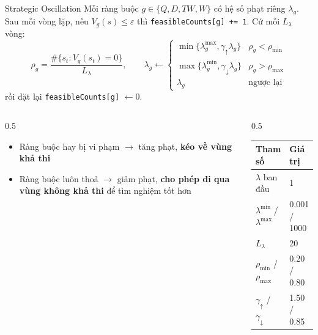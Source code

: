 \documentclass[aspectratio=169]{beamer}
\newcommand{\hl}[1]{\textcolor{blue!60!black}{\textbf{#1}}}
\begin{document}
\begin{frame}{Strategic Oscillation}
  \small Mỗi ràng buộc $g \in \{Q, D, TW, W\}$ có hệ số phạt riêng $\lambda_g$. Sau mỗi vòng lặp, nếu $V_g(s) \le \varepsilon$ thì \texttt{feasibleCounts[g] += 1}. Cứ mỗi $L_\lambda$ vòng:
  $$\rho_g = \frac{\#\{s_t : V_g(s_t) = 0\}}{L_\lambda}, \qquad
  \lambda_g \leftarrow
  \begin{cases}
    \min\{\lambda_g^{\max}, \gamma_\uparrow \lambda_g\} & \rho_g < \rho_{\min} \\
    \max\{\lambda_g^{\min}, \gamma_\downarrow \lambda_g\} & \rho_g > \rho_{\max} \\
    \lambda_g & \text{ngược lại}
  \end{cases}$$
  rồi đặt lại \texttt{feasibleCounts[g]} $\leftarrow 0$.

  \begin{columns}[T]
    \begin{column}{0.5\textwidth}
      \begin{itemize}
        \item \small Ràng buộc hay bị vi phạm $\to$ tăng phạt, \hl{kéo về vùng khả thi}
        \item \small Ràng buộc luôn thoả $\to$ giảm phạt, \hl{cho phép đi qua vùng không khả thi} để tìm nghiệm tốt hơn
      \end{itemize}
    \end{column}
    \begin{column}{0.5\textwidth}
      \centering\small
      \begin{tabular}{ll}
        \toprule
        Tham số & Giá trị \\
        \midrule
        $\lambda$ ban đầu & 1 \\
        $\lambda^{\min}$ / $\lambda^{\max}$ & 0.001 / 1000 \\
        $L_\lambda$ & 20 \\
        $\rho_{\min}$ / $\rho_{\max}$ & 0.20 / 0.80 \\
        $\gamma_\uparrow$ / $\gamma_\downarrow$ & 1.50 / 0.85 \\
        \bottomrule
      \end{tabular}
    \end{column}
  \end{columns}
\end{frame}
\end{document}
